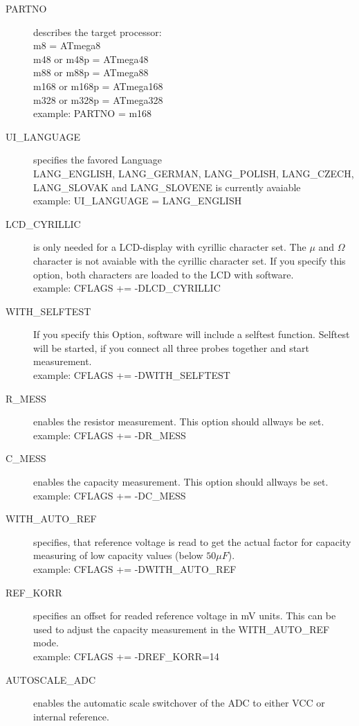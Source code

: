 \begin{description}
  \item[PARTNO] describes the target processor:\\
         m8 = ATmega8\\
         m48 or m48p = ATmega48\\
         m88 or m88p = ATmega88\\
         m168 or m168p = ATmega168\\
         m328 or m328p = ATmega328\\
    example:  PARTNO = m168
  \item[UI\_LANGUAGE] specifies the favored Language\\
    LANG\_ENGLISH, LANG\_GERMAN, LANG\_POLISH, LANG\_CZECH, LANG\_SLOVAK and LANG\_SLOVENE is currently avaiable \\
    example:  UI\_LANGUAGE = LANG\_ENGLISH
  \item[LCD\_CYRILLIC] is only needed for a LCD-display with cyrillic character set. The \(\mu\) and \(\Omega\) character
is not avaiable with the cyrillic character set.
If you specify this option, both characters are loaded to the LCD with software.\\
example: CFLAGS += -DLCD\_CYRILLIC
  \item[WITH\_SELFTEST] If you specify this Option, software will include a selftest function.
Selftest will be started, if you connect all three probes together and start measurement.\\
example: CFLAGS += -DWITH\_SELFTEST
  \item[R\_MESS] enables the resistor measurement. This option should allways be set.\\
example: CFLAGS += -DR\_MESS
  \item[C\_MESS] enables the capacity measurement. This option should allways be set.\\
example: CFLAGS += -DC\_MESS
  \item[WITH\_AUTO\_REF] specifies, that reference voltage is read to get the actual factor for capacity measuring of low capacity values (below \(50\mu F\)).\\
example:  CFLAGS += -DWITH\_AUTO\_REF
  \item[REF\_KORR] specifies an offset for readed reference voltage in mV units.
This can be used to adjust the capacity measurement in the WITH\_AUTO\_REF mode.\\
example:  CFLAGS += -DREF\_KORR=14
  \item[AUTOSCALE\_ADC] enables the automatic scale switchover of the ADC to either VCC or internal reference.

\end{description}
